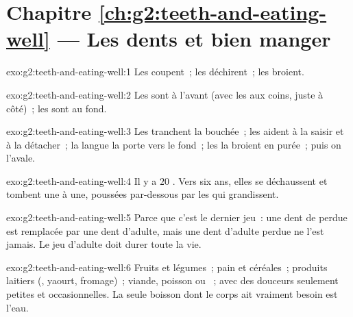 \section*{Chapitre \ref{ch:g2:teeth-and-eating-well} --- Les dents et bien manger}

\begin{solution}{exo:g2:teeth-and-eating-well:1}
Les  coupent~; les  déchirent~; les  broient.
\end{solution}

\begin{solution}{exo:g2:teeth-and-eating-well:2}
Les  sont à l'avant (avec les  aux coins, juste à
côté)~; les  sont au fond.
\end{solution}

\begin{solution}{exo:g2:teeth-and-eating-well:3}
Les  tranchent la bouchée~; les  aident à la
saisir et à la détacher~; la langue la porte vers le fond~; les
 la broient en purée~; puis on l'avale.
\end{solution}

\begin{solution}{exo:g2:teeth-and-eating-well:4}
Il y a $20$ . Vers six ans, elles se déchaussent et
tombent une à une, poussées par-dessous par les  qui
grandissent.
\end{solution}

\begin{solution}{exo:g2:teeth-and-eating-well:5}
Parce que c'est le dernier jeu~: une dent de  perdue est
remplacée par une dent d'adulte, mais une dent d'adulte perdue ne
l'est jamais. Le jeu d'adulte doit durer toute la vie.
\end{solution}

\begin{solution}{exo:g2:teeth-and-eating-well:6}
Fruits et légumes~; pain et céréales~; produits laitiers (,
yaourt, fromage)~; viande, poisson ou ~; avec des douceurs
seulement petites et occasionnelles. La seule boisson dont le corps
ait vraiment besoin est l'eau.
\end{solution}

